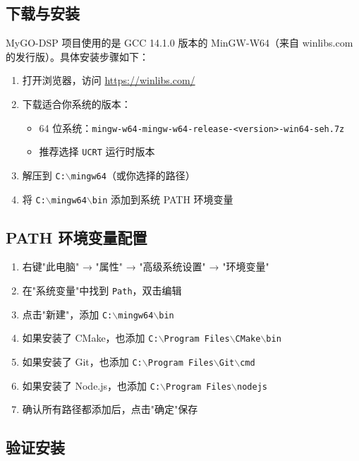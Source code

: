 ﻿\documentclass[12pt,a4paper,oneside]{ctexbook}
\begin{document}
\subsection{下载与安装}

MyGO-DSP 项目使用的是 GCC 14.1.0 版本的 MinGW-W64（来自 winlibs.com 的发行版）。具体安装步骤如下：

\begin{enumerate}
    \item 打开浏览器，访问 \url{https://winlibs.com/}
    \item 下载适合你系统的版本：
    \begin{itemize}
        \item 64 位系统：\texttt{mingw-w64-mingw-w64-release-<version>-win64-seh.7z}
        \item 推荐选择 \texttt{UCRT} 运行时版本
    \end{itemize}
    \item 解压到 \texttt{C:$\backslash$mingw64}（或你选择的路径）
    \item 将 \texttt{C:$\backslash$mingw64$\backslash$bin} 添加到系统 PATH 环境变量
\end{enumerate}

\subsection{PATH 环境变量配置}

\begin{enumerate}
    \item 右键"此电脑" → "属性" → "高级系统设置" → "环境变量"
    \item 在"系统变量"中找到 \texttt{Path}，双击编辑
    \item 点击"新建"，添加 \texttt{C:$\backslash$mingw64$\backslash$bin}
    \item 如果安装了 CMake，也添加 \texttt{C:$\backslash$Program Files$\backslash$CMake$\backslash$bin}
    \item 如果安装了 Git，也添加 \texttt{C:$\backslash$Program Files$\backslash$Git$\backslash$cmd}
    \item 如果安装了 Node.js，也添加 \texttt{C:$\backslash$Program Files$\backslash$nodejs}
    \item 确认所有路径都添加后，点击"确定"保存
\end{enumerate}

\subsection{验证安装}
\end{document}
